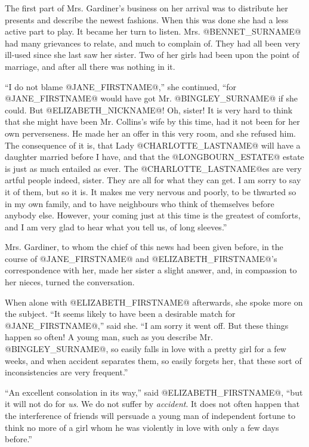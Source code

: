 The first part of Mrs. Gardiner's business on her arrival was to
distribute her presents and describe the newest fashions. When this was
done she had a less active part to play. It became her turn to listen.
Mrs. @BENNET_SURNAME@ had many grievances to relate, and much to complain of. They
had all been very ill-used since she last saw her sister. Two of her
girls had been upon the point of marriage, and after all there was
nothing in it.

``I do not blame @JANE_FIRSTNAME@,'' she continued, ``for @JANE_FIRSTNAME@ would have got Mr.
@BINGLEY_SURNAME@ if she could. But @ELIZABETH_NICKNAME@! Oh, sister! It is very hard to think
that she might have been Mr. Collins's wife by this time, had it not
been for her own perverseness. He made her an offer in this very room,
and she refused him. The consequence of it is, that Lady @CHARLOTTE_LASTNAME@ will have
a daughter married before I have, and that the @LONGBOURN_ESTATE@ estate is just
as much entailed as ever. The @CHARLOTTE_LASTNAME@es are very artful people indeed,
sister. They are all for what they can get. I am sorry to say it of
them, but so it is. It makes me very nervous and poorly, to be thwarted
so in my own family, and to have neighbours who think of themselves
before anybody else. However, your coming just at this time is the
greatest of comforts, and I am very glad to hear what you tell us, of
long sleeves.''

Mrs. Gardiner, to whom the chief of this news had been given before,
in the course of @JANE_FIRSTNAME@ and @ELIZABETH_FIRSTNAME@'s correspondence with her, made her
sister a slight answer, and, in compassion to her nieces, turned the
conversation.

When alone with @ELIZABETH_FIRSTNAME@ afterwards, she spoke more on the subject. ``It
seems likely to have been a desirable match for @JANE_FIRSTNAME@,'' said she. ``I am
sorry it went off. But these things happen so often! A young man, such
as you describe Mr. @BINGLEY_SURNAME@, so easily falls in love with a pretty girl
for a few weeks, and when accident separates them, so easily forgets
her, that these sort of inconsistencies are very frequent.''

``An excellent consolation in its way,'' said @ELIZABETH_FIRSTNAME@, ``but it will not
do for \textit{us}. We do not suffer by \textit{accident}. It does not often
happen that the interference of friends will persuade a young man of
independent fortune to think no more of a girl whom he was violently in
love with only a few days before.''

